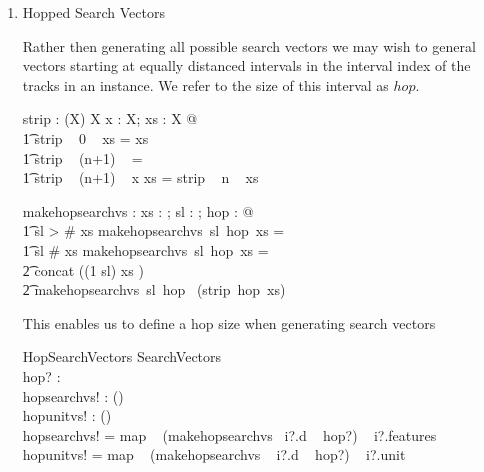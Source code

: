 \documentclass[11pt]{article}
\begin{document}
\begin{enumerate}
\begin{schema}{SearchVectors}
	i? : Instance \\
	sl? : \nat \\
	searchvs! :  \seq (\seq \Vdsl) \\  
	unitvs! :  \seq (\seq \Vsl) \\  
\where
	searchvs! =   map ~ (makesearchvs ~ sl?) ~ i?.features  \\
	unitvs! =  map ~ (makesearchvs ~ sl?) ~ i?.unit  \\
\end{schema}

\item \textsf{Hopped Search Vectors}

Rather then generating all possible search vectors we may wish to general vectors starting at equally distanced intervals in the interval index of the tracks in an instance.  We refer to the size of this interval as $hop$. 

\begin{gendef}[X]
    strip : \nat \fun (\seq X) \fun \seq X
    \where
        \forall x : X; xs : \seq X @ \\
	\t1         strip ~ 0  ~ xs = xs \land \\
	\t1        strip ~ (n+1) ~ \langle \rangle = \langle \rangle \\
	\t1         strip ~ (n+1) ~ \langle x \rangle \cat xs = strip ~ n ~ xs
\end{gendef} 

\begin{axdef}
 	makehopsearchvs : \nat \fun  \nat \fun \seq \Vd \fun \seq \Vdsl
\where 
	\forall xs :  \seq \FV ; sl : \nat  ; hop  : \nat  @ \\
\t1 sl > \# xs \implies makehopsearchvs~sl~hop~xs = \langle \rangle  \land \\
\t1 sl \leq \# xs \implies makehopsearchvs~sl~hop~xs = \\
\t2 concat (\langle (1 \upto sl) \dres xs  \rangle)  \cat  \\
\t2 			makehopsearchvs~sl~hop~ (strip~hop~xs)
\end{axdef}

This enables us to define a hop size when generating search vectors

\begin{schema}{HopSearchVectors}
	SearchVectors \\
	hop? : \nat \\
	hopsearchvs! :  \seq (\seq \Vdsl) \\  
	hopunitvs! :  \seq (\seq \Vsl) \\  
\where
	hopsearchvs! =  map ~ (makehopsearchvs ~i?.d ~ hop?) ~ i?.features  \\
	hopunitvs! =  map ~ (makehopsearchvs ~ i?.d ~ hop?) ~ i?.unit  \\
\end{schema}


\end{enumerate}
\end{document}
